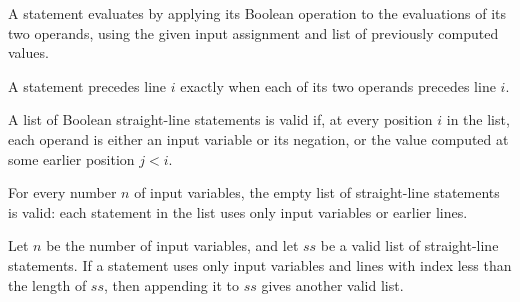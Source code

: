 \begin{definition}
\label{BoolCircuit.SLStmt.eval}
\leanok
{}
A statement evaluates by applying its Boolean operation to the evaluations of its two
operands, using the given input assignment and list of previously computed values.
\end{definition}

\begin{definition}
\label{BoolCircuit.SLStmt.Before}
\leanok
{}
A statement precedes line $i$ exactly when each of its two operands precedes line $i$.
\end{definition}

\begin{definition}
\label{BoolCircuit.StraightLine.LinesValid}
\leanok
{}
A list of Boolean straight-line statements is valid if, at every position $i$ in the
list, each operand is either an input variable or its negation, or the value computed at
some earlier position $j<i$.
\end{definition}

\begin{theorem}
\label{BoolCircuit.StraightLine.LinesValid.nil}
\leanok
{}
For every number $n$ of input variables, the empty list of straight-line statements is
valid: each statement in the list uses only input variables or earlier lines.
\end{theorem}

\begin{theorem}
\label{BoolCircuit.StraightLine.LinesValid.snoc}
\leanok
{}
Let $n$ be the number of input variables, and let $ss$ be a valid list of straight-line
statements. If a statement uses only input variables and lines with index less than the
length of $ss$, then appending it to $ss$ gives another valid list.
\end{theorem}

